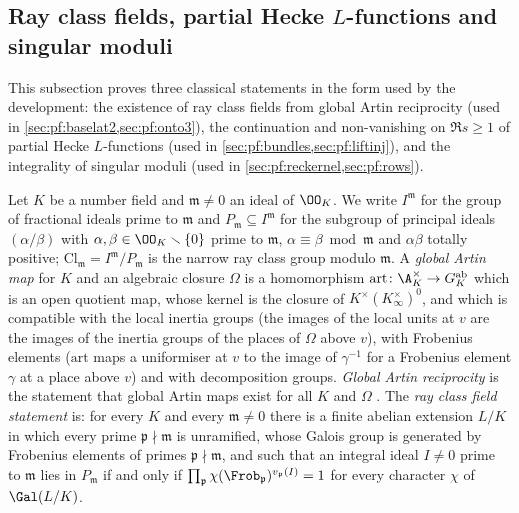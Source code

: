 \subsection{Ray class fields, partial Hecke \texorpdfstring{$L$}{L}-functions and singular moduli}\label{sec:pf:sh-misc:cft}

This subsection proves three classical statements in the form used by the development: the existence of ray class fields
from global Artin reciprocity (used in \cref{sec:pf:baselat2,sec:pf:onto3}), the continuation and non-vanishing on
$\Re s\ge1$ of partial Hecke $L$-functions (used in \cref{sec:pf:bundles,sec:pf:liftinj}), and the integrality of singular
moduli (used in \cref{sec:pf:reckernel,sec:pf:rows}).

Let $K$ be a number field and $\mathfrak m\ne0$ an ideal of $\OO_K$. We write $I^{\mathfrak m}$ for the group of fractional ideals prime to
$\mathfrak m$ and $P_{\mathfrak m}\subseteq I^{\mathfrak m}$ for the subgroup of principal ideals $(\alpha/\beta)$ with $\alpha,\beta\in\OO_K\smallsetminus\{0\}$
prime to $\mathfrak m$, $\alpha\equiv\beta\bmod\mathfrak m$ and $\alpha\beta$ totally positive; $\mathrm{Cl}_{\mathfrak m}=I^{\mathfrak m}/P_{\mathfrak m}$ is the
narrow ray class group modulo $\mathfrak m$. A \emph{global Artin map} for $K$ and an algebraic closure $\Omega$ is a homomorphism
$\mathrm{art}\colon\A_K^\times\to G_K^{\mathrm{ab}}$ which is an open quotient map, whose kernel is the closure of $K^\times(K_\infty^\times)^0$, and
which is compatible with the local inertia groups (the images of the local units at $v$ are the images of the inertia groups of the places
of $\Omega$ above $v$), with Frobenius elements ($\mathrm{art}$ maps a uniformiser at $v$ to the image of $\gamma^{-1}$ for a Frobenius element
$\gamma$ at a place above $v$) and with decomposition groups. \emph{Global Artin reciprocity} is the statement that global Artin maps exist for all
$K$ and $\Omega$ \cite{Tate1967gcft}. The \emph{ray class field statement} is: for every $K$ and every $\mathfrak m\ne0$ there is a finite abelian
extension $L/K$ in which every prime $\mathfrak p\nmid\mathfrak m$ is unramified, whose Galois group is generated by Frobenius elements of
primes $\mathfrak p\nmid\mathfrak m$, and such that an integral ideal $I\ne0$ prime to $\mathfrak m$ lies in $P_{\mathfrak m}$ if and only if
$\prod_{\mathfrak p}\chi(\Frob_{\mathfrak p})^{v_{\mathfrak p}(I)}=1$ for every character $\chi$ of $\Gal(L/K)$.

